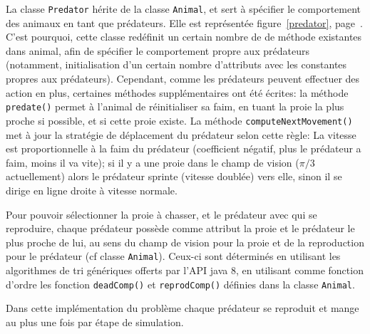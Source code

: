 \documentclass[12pt,a4paper,titlepage]{article}
\begin{document}
La classe \texttt{Predator} hérite de la classe \texttt{Animal}, et sert à spécifier le comportement des animaux en tant que prédateurs. Elle est représentée figure~\ref{predator}, page~\pageref{predator}. C'est pourquoi, cette classe redéfinit un certain nombre de de méthode existantes dans animal, afin de spécifier le comportement propre aux prédateurs (notamment, initialisation d'un certain nombre d'attributs avec les constantes propres aux prédateurs). Cependant, comme les prédateurs peuvent effectuer des action en plus, certaines méthodes supplémentaires ont été écrites: la méthode \texttt{predate()} permet à l'animal de réinitialiser sa faim, en tuant la proie la plus proche si possible, et si cette proie existe. La méthode \texttt{computeNextMovement()} met à jour la stratégie de déplacement du prédateur selon cette règle: La vitesse est proportionnelle à la faim du prédateur (coefficient négatif, plus le prédateur a faim, moins il va vite); si il y a une proie dans le champ de vision ($\pi/3$ actuellement) alors le prédateur sprinte (vitesse doublée) vers elle, sinon il se dirige en ligne droite à vitesse normale.

Pour pouvoir sélectionner la proie à chasser, et le prédateur avec qui se reproduire, chaque prédateur possède comme attribut la proie et le prédateur le plus proche de lui, au sens du champ de vision pour la proie et de la reproduction pour le prédateur (cf classe \texttt{Animal}). Ceux-ci sont déterminés en utilisant les algorithmes de tri génériques offerts par l'API java 8, en utilisant comme fonction d'ordre les fonction \texttt{deadComp()} et \texttt{reprodComp()} définies dans la classe \texttt{Animal}.

Dans cette implémentation du problème chaque prédateur se reproduit et mange au plus une fois par étape de simulation.
\FloatBarrier
\end{document}
